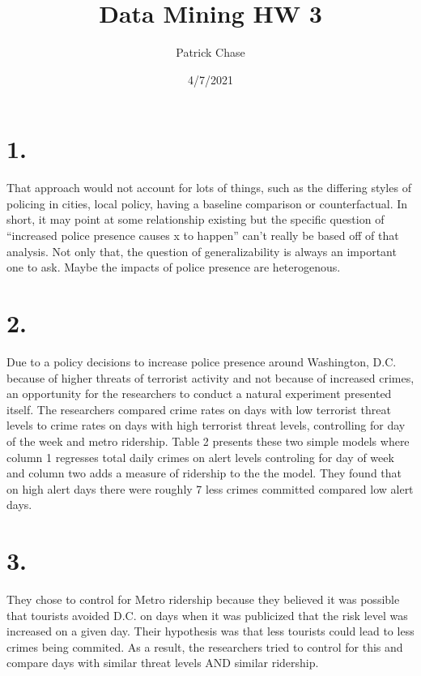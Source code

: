 \documentclass[
]{article}
\title{Data Mining HW 3}
\author{Patrick Chase}
\date{4/7/2021}
\begin{document}
\maketitle

\hypertarget{section}{%
\section{1.}\label{section}}

That approach would not account for lots of things, such as the
differing styles of policing in cities, local policy, having a baseline
comparison or counterfactual. In short, it may point at some
relationship existing but the specific question of ``increased police
presence causes x to happen'' can't really be based off of that
analysis. Not only that, the question of generalizability is always an
important one to ask. Maybe the impacts of police presence are
heterogenous.

\hypertarget{section-1}{%
\section{2.}\label{section-1}}

Due to a policy decisions to increase police presence around Washington,
D.C. because of higher threats of terrorist activity and not because of
increased crimes, an opportunity for the researchers to conduct a
natural experiment presented itself. The researchers compared crime
rates on days with low terrorist threat levels to crime rates on days
with high terrorist threat levels, controlling for day of the week and
metro ridership. Table 2 presents these two simple models where column 1
regresses total daily crimes on alert levels controling for day of week
and column two adds a measure of ridership to the the model. They found
that on high alert days there were roughly 7 less crimes committed
compared low alert days.

\hypertarget{section-2}{%
\section{3.}\label{section-2}}

They chose to control for Metro ridership because they believed it was
possible that tourists avoided D.C. on days when it was publicized that
the risk level was increased on a given day. Their hypothesis was that
less tourists could lead to less crimes being commited. As a result, the
researchers tried to control for this and compare days with similar
threat levels AND similar ridership.
\end{document}
